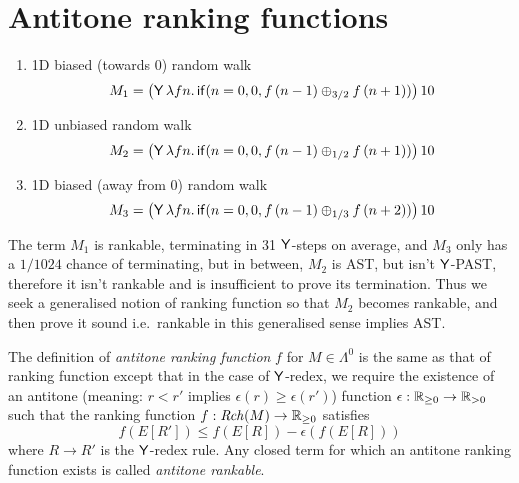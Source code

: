 \section{Antitone ranking functions}
\label{sec:antitone}

\begin{example}
\label{ex:ac-ranking}
\begin{enumerate}
\item 1D biased (towards 0) random walk
\[
M_1 = 
\big(\mathsf{Y} \, \lambda f n . \, 
\mathsf{if}(n = 0, 0, f \, (n - 1) \oplus_{3/2} f \, (n + 1))\big) \, 10
\]

\item 1D unbiased random walk
\[
M_2 = 
\big(\mathsf{Y} \, \lambda f n . \, 
\mathsf{if}(n = 0, 0, f \, (n - 1) \oplus_{1/2} f \, (n + 1))\big) \, 10
\]

\item 1D biased (away from 0) random walk
\[
M_3 = 
\big(\mathsf{Y} \, \lambda f n . \, 
\mathsf{if}(n = 0, 0, f \, (n - 1) \oplus_{1/3} f \, (n + 2))\big) \, 10
\]



\end{enumerate}
\end{example}

The term $M_1$ is rankable, terminating in 31 $\tY$-steps on average, and $M_3$ only has a $1/1024$ chance of terminating, but in between, $M_2$ is AST, but isn't $\tY$-PAST, therefore it isn't rankable and  is insufficient to prove its termination. 
Thus we seek a generalised notion of ranking function so that $M_2$ becomes rankable, and then prove it sound i.e.~rankable in this generalised sense implies AST.


\begin{definition}
The definition of \emph{antitone ranking function} $f$ for $M \in \Lambda^0$ is the same as that of ranking function except that in the case of $\tY$-redex, 
we require the existence of an antitone (meaning: $r < r'$ implies $\epsilon(r) \geq \epsilon(r')$) function $\epsilon : \nnReal \to \pReal$ such that the ranking function $f :\mathit{Rch}(M) \to \mathbb{R}_{{\geq}0}$ satisfies
\[f(E[R']) \leq f(E[R]) - \epsilon(f(E[R])) \] 
where $R \to R'$ is the $\tY$-redex rule.
Any closed term for which an antitone ranking function exists is called \emph{antitone rankable}.
\iffalse
Given a ranking function $f$ on $M \in \Lambda^0$, we say that $f$ is \emph{antitone} if there exists an antitone function\footnote{i.e.~$r < r'$ implies $\epsilon(r) \geq \epsilon(r')$} $\epsilon : \nnReal \to \pReal$ such that %
\[
f(E[R']) \leq f(E[R]) - \epsilon(f(E[R])) 
\]
for all $E[R'] \in \mathit{Rch}(M)$ where $R \to R'$ is the $\tY$-redex rule.
\fi
\end{definition}

